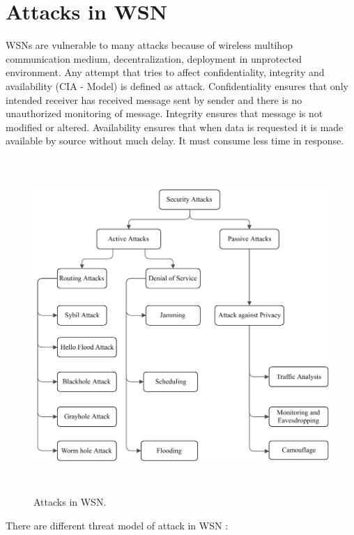 \section{Attacks in WSN} \label{S2.2}
WSNs are vulnerable to many attacks because of wireless multihop communication medium, decentralization, deployment in unprotected environment. Any attempt that tries to affect confidentiality, integrity and availability (CIA - Model) is defined as attack. Confidentiality ensures that only intended receiver has received message sent by sender and there is no unauthorized monitoring of message. Integrity ensures that message is not modified or altered. Availability ensures that when data is requested it is made available by source without much delay. It must consume less time in response.
\begin{figure}[ht]
\center	
\includegraphics[width=5in, height=5in]{Figures/PDF/WSN-attacks.pdf}
\caption{Attacks in WSN.}
\label{WSN-Attacks}	
\end{figure}
\noindent
There are different threat model of attack in WSN \cite{roosta2006taxonomy}:
